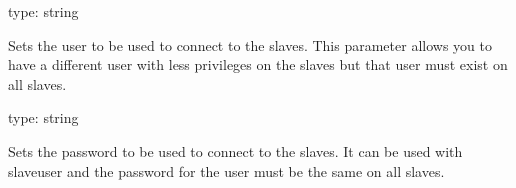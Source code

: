 \documentclass[letterpaper,10pt,english]{sphinxmanual}
\begin{document}

\begin{fulllineitems}
\label{\detokenize{mariadb-query-digest:cmdoption-mariadb-query-digest-slave-user}}
\sphinxAtStartPar
type: string

\sphinxAtStartPar
Sets the user to be used to connect to the slaves.
This parameter allows you to have a different user with less privileges on the
slaves but that user must exist on all slaves.

\end{fulllineitems}


\begin{fulllineitems}
\label{\detokenize{mariadb-query-digest:cmdoption-mariadb-query-digest-slave-password}}
\sphinxAtStartPar
type: string

\sphinxAtStartPar
Sets the password to be used to connect to the slaves.
It can be used with \textendash{}slave\sphinxhyphen{}user and the password for the user must be the same
on all slaves.

\end{fulllineitems}
\end{document}
